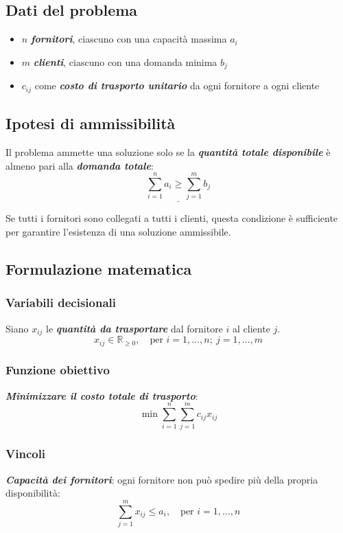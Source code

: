 \subsection{Dati del problema}
\begin{itemize}
    \item $n$ \textbf{\textit{fornitori}}, ciascuno con una capacità massima $a_i$
    \item $m$ \textbf{\textit{clienti}}, ciascuno con una domanda minima $b_j$
    \item $c_{ij}$ come \textbf{\textit{costo di trasporto unitario}} da ogni fornitore a ogni cliente
\end{itemize}

\subsection{Ipotesi di ammissibilità}
Il problema ammette una soluzione solo se la \textbf{\textit{quantità totale disponibile}} 
è almeno pari alla \textbf{\textit{domanda totale}}:
\[
\underline{\sum_{i=1}^{n} a_i \geq \sum_{j=1}^{m} b_j}
\]

Se tutti i fornitori sono collegati a tutti i clienti, questa condizione 
è sufficiente per garantire l'esistenza di una soluzione ammissibile.

\subsection{Formulazione matematica}
\subsubsection{Variabili decisionali}
Siano $x_{ij}$ le \textbf{\textit{quantità da trasportare}} dal fornitore $i$ al cliente $j$.
\[
x_{ij} \in \mathbb{R}_{\geq 0}, \quad \text{per } i = 1, \dots, n;\ j = 1, \dots, m
\]

\subsubsection{Funzione obiettivo}
\textbf{\textit{Minimizzare il costo totale di trasporto}}:
\[
\min \sum_{i=1}^{n} \sum_{j=1}^{m} c_{ij} x_{ij}
\]

\subsubsection{Vincoli}
\textbf{\textit{Capacità dei fornitori}}: ogni fornitore non può spedire più della propria disponibilità:
\[
\sum_{j=1}^{m} x_{ij} \leq a_i, \quad \text{per } i = 1, \dots, n
\]

